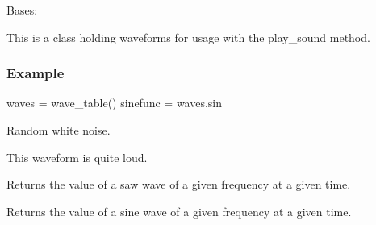 \documentclass[letterpaper,10pt,english,openany,oneside]{sphinxmanual}
\begin{document}
\begin{fulllineitems}

\pysigstartsignatures
{}
\pysigstopsignatures
\sphinxAtStartPar
Bases: 

\sphinxAtStartPar
This is a class holding waveforms for usage with the play\_sound method.
\subsubsection*{Example}

\sphinxAtStartPar
waves = wave\_table()
sinefunc = waves.sin


\begin{fulllineitems}

\pysigstartsignatures
{}
\pysigstopsignatures
\sphinxAtStartPar
Random white noise.

\sphinxAtStartPar
This waveform is quite loud.

\end{fulllineitems}



\begin{fulllineitems}

\pysigstartsignatures
{}
\pysigstopsignatures
\sphinxAtStartPar
Returns the value of a saw wave of a given frequency at a given time.

\end{fulllineitems}



\begin{fulllineitems}

\pysigstartsignatures
{}
\pysigstopsignatures
\sphinxAtStartPar
Returns the value of a sine wave of a given frequency at a given time.


\end{fulllineitems}
\end{fulllineitems}
\end{document}
